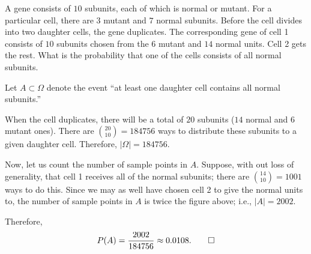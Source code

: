\begin{problem}[Handout 1, \# 7]
  A gene consists of \(10\) subunits, each of which is normal or
  mutant. For a particular cell, there are \(3\) mutant and \(7\) normal
  subunits. Before the cell divides into two daughter cells, the gene
  duplicates. The corresponding gene of cell 1 consists of \(10\) subunits
  chosen from the \(6\) mutant and \(14\) normal units. Cell 2 gets the
  rest. What is the probability that one of the cells consists of all
  normal subunits.
\end{problem}
\begin{solution*}
  Let \(A\subset\Omega\) denote the event ``at least one daughter cell
  contains all normal subunits.''

  When the cell duplicates, there will be a total of \(20\) subunits
  (\(14\) normal and \(6\) mutant ones). There are
  \(\binom{20}{10}=184756\) ways to distribute these subunits to a given
  daughter cell. Therefore, \(|\Omega|=184756\).

  Now, let us count the number of sample points in \(A\). Suppose, with out
  loss of generality, that cell 1 receives all of the normal subunits;
  there are \(\binom{14}{10}=1001\) ways to do this. Since we may as well have
  chosen cell 2 to give the normal units to, the number of sample points in
  \(A\) is twice the figure above; i.e., \(|A|=2002\).

  Therefore,
  \[
    P(A)=\frac{2002}{184756}\approx0.0108.\qedhere
  \]
\end{solution*}

